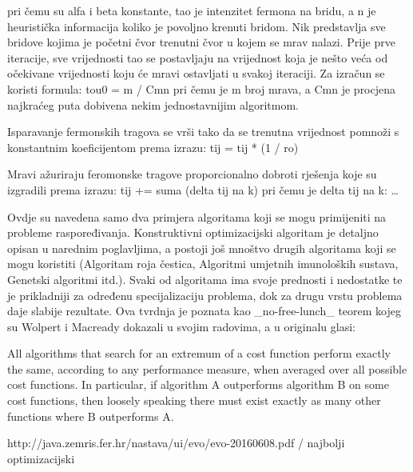 pri čemu su alfa i beta konstante, tao je intenzitet fermona na bridu, a n je heuristička informacija koliko je povoljno krenuti bridom. Nik predstavlja
sve bridove kojima je početni čvor trenutni čvor u kojem se mrav nalazi. Prije prve iteracije, sve vrijednosti tao se postavljaju na
vrijednost koja je nešto veća od očekivane vrijednosti koju će mravi ostavljati u svakoj iteraciji. Za izračun se koristi formula:
tou0 = m / Cmn
pri čemu je m broj mrava, a Cmn je procjena najkraćeg puta dobivena nekim jednostavnijim algoritmom.

Isparavanje fermonskih tragova se vrši tako da se trenutna vrijednost pomnoži s konstantnim koeficijentom prema izrazu:
tij = tij * (1 / ro)

Mravi ažuriraju feromonske tragove proporcionalno dobroti rješenja koje su izgradili prema izrazu:
tij += suma (delta tij na k)
pri čemu je delta tij na k:
\dots




Ovdje su navedena samo dva primjera algoritama koji se mogu primijeniti na probleme raspoređivanja. Konstruktivni optimizacijski
algoritam je detaljno opisan u narednim poglavljima, a postoji još mnoštvo drugih algoritama koji se mogu koristiti (Algoritam roja
čestica, Algoritmi umjetnih imunoloških sustava, Genetski algoritmi itd.). Svaki od algoritama ima svoje prednosti i nedostatke te je
prikladniji za određenu specijalizaciju problema, dok za drugu vrstu problema daje slabije rezultate. Ova tvrdnja je poznata kao
_no-free-lunch_ teorem kojeg su Wolpert i Macready dokazali u svojim radovima, a u originalu glasi:

All algorithms that search for an extremum of a cost function perform exactly the same, according to any performance measure,
when averaged over all possible cost functions. In particular, if algorithm A outperforms algorithm B on some cost functions, then
loosely speaking there must exist exactly as many other functions where B outperforms A.

http://java.zemris.fer.hr/nastava/ui/evo/evo-20160608.pdf / najbolji optimizacijski